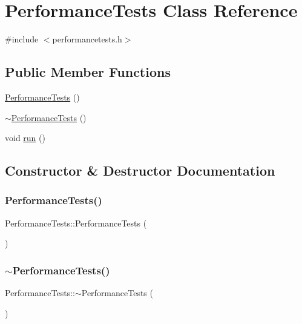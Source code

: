 \hypertarget{class_performance_tests}{}\section{Performance\+Tests Class Reference}
\label{class_performance_tests}


{\ttfamily \#include $<$performancetests.\+h$>$}

\subsection*{Public Member Functions}
\begin{DoxyCompactItemize}
\item 
\mbox{\hyperlink{class_performance_tests_ac8c32855dc70f74be063396bd6f76cf4}{Performance\+Tests}} ()
\item 
\mbox{\hyperlink{class_performance_tests_adc3a6beb9f16d8442cb9918dd2e9a8bb}{$\sim$\+Performance\+Tests}} ()
\item 
void \mbox{\hyperlink{class_performance_tests_aa55ebdbc84db93cc45adfdf7163f90b4}{run}} ()
\end{DoxyCompactItemize}


\subsection{Constructor \& Destructor Documentation}
\mbox{\label{class_performance_tests_ac8c32855dc70f74be063396bd6f76cf4}} 
\subsubsection{\texorpdfstring{PerformanceTests()}{PerformanceTests()}}
{\footnotesize\ttfamily Performance\+Tests\+::\+Performance\+Tests (\begin{DoxyParamCaption}{ }\end{DoxyParamCaption})}

\mbox{\label{class_performance_tests_adc3a6beb9f16d8442cb9918dd2e9a8bb}} 
\subsubsection{\texorpdfstring{$\sim$PerformanceTests()}{~PerformanceTests()}}
{\footnotesize\ttfamily Performance\+Tests\+::$\sim$\+Performance\+Tests (\begin{DoxyParamCaption}{ }\end{DoxyParamCaption})}



